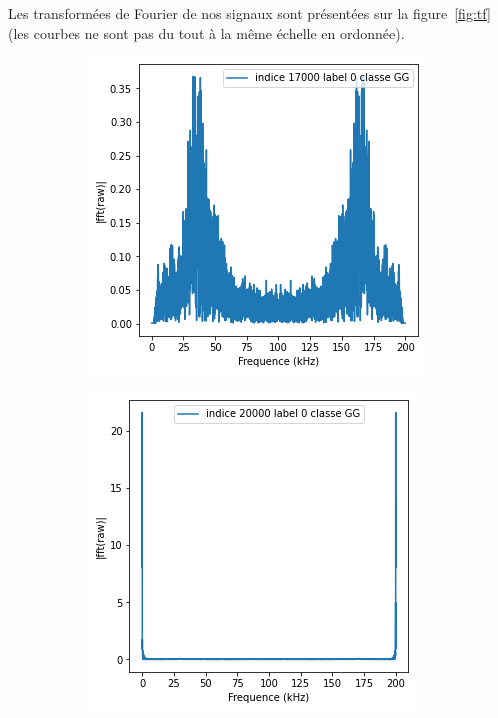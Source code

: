 Les transformées de Fourier de nos signaux sont présentées sur la figure~\ref{fig:tf} (les courbes ne sont pas du tout à la même échelle en ordonnée).
\begin{figure}[!h]
\centering
  \begin{subfigure}[b]{0.3\textwidth}
    \includegraphics[width=\textwidth]{./images/17000fft.png}
  \end{subfigure}
  \begin{subfigure}[b]{0.3\textwidth}
    \includegraphics[width=\textwidth]{./images/20000fft.png}

\end{subfigure}
\end{figure}
